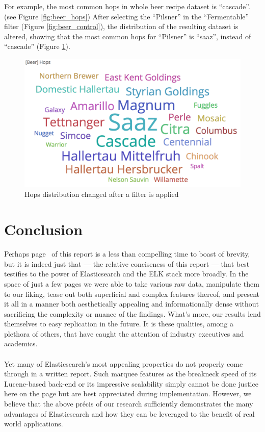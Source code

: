 \documentclass[bibliography=totoc]{article}
\begin{document}
For example, the most common hops in whole beer recipe dataset is ``cascade''. (see Figure \ref{fig:beer_hops}) After selecting the ``Pilsner'' in the ``Fermentable'' filter (Figure \ref{fig:beer_control}), the distribution of the resulting dataset is altered, showing that the most common hops for ``Pilsner'' is ``saaz'', instead of ``cascade'' (Figure \ref{fig:beer_hops_after}). 

\begin{figure}
  \centering
  \includegraphics[width=\linewidth]{beer_hops_after.png}
 \caption{Hops distribution changed after a filter is applied}
  \label{fig:beer_hops_after}
\end{figure}

\section{Conclusion}
Perhaps page \thepage\ of this report is a less than compelling time to boast of brevity, but it is
indeed just that — the relative conciseness of this report — that best testifies to the power of Elasticsearch
and the ELK stack more broadly. In the space of just a few pages we were able to take various raw data,
manipulate them to our liking, tease out both superficial and complex features thereof, and present it all in
a manner both aesthetically appealing and informationally dense without sacrificing the complexity or nuance
of the findings. What's more, our results lend themselves to easy replication in the future. It is these
qualities, among a plethora of others, that have caught the attention of industry executives and academics.
\\
\\
Yet many of Elasticsearch's most appealing properties do not properly come through in a written report.
Such marquee features as the breakneck speed of its Lucene-based back-end or its impressive scalability
simply cannot be done justice here on the page but are best appreciated during implementation. However, we
believe that the above précis of our research sufficiently demonstrates the many advantages of Elasticsearch
and how they can be leveraged to the benefit of real world applications.
\end{document}
